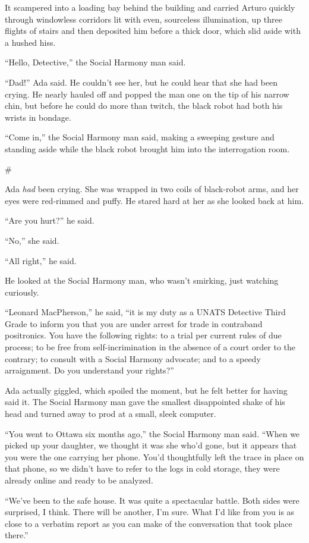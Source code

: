 It scampered into a loading bay behind the building and carried
Arturo quickly through windowless corridors lit with even,
sourceless illumination, up three flights of stairs and then
deposited him before a thick door, which slid aside with a hushed
hiss.

“Hello, Detective,” the Social Harmony man said.

“Dad!” Ada said. He couldn’t see her, but he could hear that she
had been crying. He nearly hauled off and popped the man one on the
tip of his narrow chin, but before he could do more than twitch,
the black robot had both his wrists in bondage.

“Come in,” the Social Harmony man said, making a sweeping gesture
and standing aside while the black robot brought him into the
interrogation room.

\#

Ada \emph{had} been crying. She was wrapped in two coils of
black-robot arms, and her eyes were red-rimmed and puffy. He stared
hard at her as she looked back at him.

“Are you hurt?” he said.

“No,” she said.

“All right,” he said.

He looked at the Social Harmony man, who wasn’t smirking, just
watching curiously.

“Leonard MacPherson,” he said, “it is my duty as a UNATS Detective
Third Grade to inform you that you are under arrest for trade in
contraband positronics. You have the following rights: to a trial
per current rules of due process; to be free from
self-incrimination in the absence of a court order to the contrary;
to consult with a Social Harmony advocate; and to a speedy
arraignment. Do you understand your rights?”

Ada actually giggled, which spoiled the moment, but he felt better
for having said it. The Social Harmony man gave the smallest
disappointed shake of his head and turned away to prod at a small,
sleek computer.

“You went to Ottawa six months ago,” the Social Harmony man said.
“When we picked up your daughter, we thought it was she who’d gone,
but it appears that you were the one carrying her phone. You’d
thoughtfully left the trace in place on that phone, so we didn’t
have to refer to the logs in cold storage, they were already online
and ready to be analyzed.

“We’ve been to the safe house. It was quite a spectacular battle.
Both sides were surprised, I think. There will be another, I’m
sure. What I’d like from you is as close to a verbatim report as
you can make of the conversation that took place there.”

